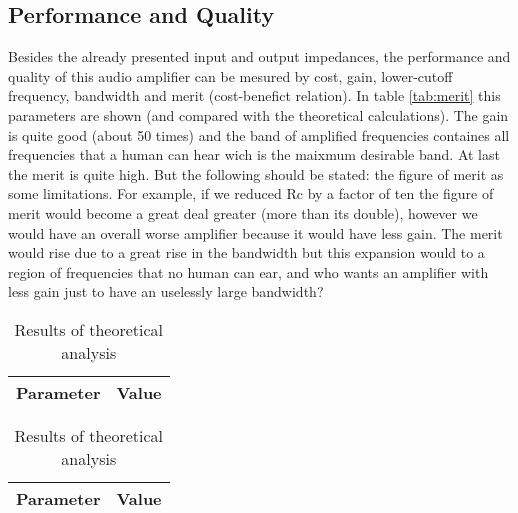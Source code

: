 \subsection{Performance and Quality}
Besides the already presented input and output impedances, the performance and quality of this audio amplifier can be mesured by cost, gain, lower-cutoff frequency, bandwidth and merit (cost-benefict relation). In table \ref{tab:merit} this parameters are shown (and compared with the theoretical calculations). The gain is quite good (about 50 times) and the band of amplified frequencies containes all frequencies that a human can hear wich is the maixmum desirable band. At last the merit is quite high. But the following should be stated: the figure of merit as some limitations. For example, if we reduced Rc by a factor of ten the figure of merit would become a great deal greater (more than its double), however we would have an overall worse amplifier because it would have less gain. The merit would rise due to a great rise in the bandwidth but this expansion would to a region of frequencies that no human can ear, and who wants an amplifier with less gain just to have an uselessly large bandwidth?


\begin{table}[!htb]
  \begin{minipage}{.5\linewidth}
     \centering
  \begin{tabular}{|c|c|}
    \hline    
    {\bf Parameter} & {\bf Value} \\ \hline
    
 \end{tabular}
 \caption{Results of simulation analysis}
 \label{tab:merit}
  \end{minipage}%
    \hspace{2 mm}
    \begin{minipage}{.5\linewidth}
      \centering
        \begin{tabular}{|c|c|}
    \hline    
    {\bf Parameter} & {\bf Value} \\ \hline
    
 \end{tabular}
        \caption{Results of theoretical analysis}
        \label{compmerit}
    \end{minipage} 
\end{table}

\newpage
